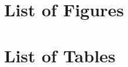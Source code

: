\documentclass[a4paper, 10pt]{article}
\begin{document}
\pagebreak
\section{List of Figures}
\renewcommand{\listfigurename}{\vskip -1cm} %
\listoffigures

\pagebreak
\section{List of Tables}
\renewcommand{\listtablename}{\vskip -1cm} %
\listoftables
\end{document}
